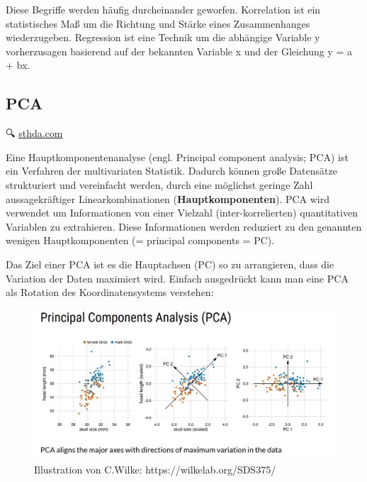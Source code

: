\documentclass[
]{article}
\begin{document}
Diese Begriffe werden häufig durcheinander geworfen. Korrelation ist ein statistisches Maß um die Richtung und Stärke eines Zusammenhanges wiederzugeben. Regression ist eine Technik um die abhängige Variable y vorherzusagen basierend auf der bekannten Variable x und der Gleichung y = a + bx.

\hypertarget{pca}{%
\subsection{PCA}\label{pca}}

🔍 \href{http://www.sthda.com/english/articles/31-principal-component-methods-in-r-practical-guide/112-pca-principal-component-analysis-essentials/}{sthda.com}

Eine Hauptkomponentenanalyse (engl. Principal component analysis; PCA) ist ein Verfahren der multivariaten Statistik. Dadurch können große Datensätze strukturiert und vereinfacht werden, durch eine möglichst geringe Zahl aussagekräftiger Linearkombinationen (\textbf{Hauptkomponenten}). PCA wird verwendet um Informationen von einer Vielzahl (inter-korrelierten) quantitativen Variablen zu extrahieren. Diese Informationen werden reduziert zu den genannten wenigen Hauptkomponenten (= principal components = PC).

Das Ziel einer PCA ist es die Hauptachsen (PC) so zu arrangieren, dass die Variation der Daten maximiert wird. Einfach ausgedrückt kann man eine PCA als Rotation des Koordinatensystems verstehen:

\begin{figure}

{\centering \includegraphics[width=19.69in]{images/046} 

}

\caption{Illustration von C.Wilke: https://wilkelab.org/SDS375/}\label{fig:unnamed-chunk-267}
\end{figure}
\end{document}
